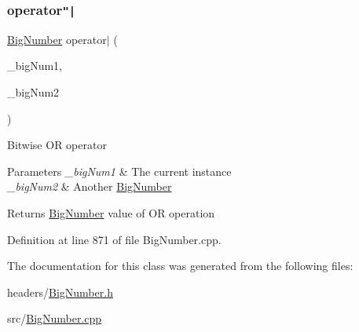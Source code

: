 \subsubsection{\texorpdfstring{operator\texttt{"|}}{operator|}}
{\footnotesize\ttfamily \mbox{\hyperlink{class_big_nums_1_1_big_number}{Big\+Number}} operator$\vert$ (\begin{DoxyParamCaption}\item[{const \mbox{\hyperlink{class_big_nums_1_1_big_number}{Big\+Number}} \&}]{\+\_\+big\+Num1,  }\item[{const \mbox{\hyperlink{class_big_nums_1_1_big_number}{Big\+Number}} \&}]{\+\_\+big\+Num2 }\end{DoxyParamCaption})\hspace{0.3cm}{\ttfamily [friend]}}

Bitwise OR operator 
\begin{DoxyParams}{Parameters}
{\em \+\_\+big\+Num1} & The current instance \\
\hline
{\em \+\_\+big\+Num2} & Another \mbox{\hyperlink{class_big_nums_1_1_big_number}{Big\+Number}} \\
\hline
\end{DoxyParams}
\begin{DoxyReturn}{Returns}
\mbox{\hyperlink{class_big_nums_1_1_big_number}{Big\+Number}} value of OR operation 
\end{DoxyReturn}


Definition at line 871 of file Big\+Number.\+cpp.



The documentation for this class was generated from the following files\+:\begin{DoxyCompactItemize}
\item 
headers/\mbox{\hyperlink{_big_number_8h}{Big\+Number.\+h}}\item 
src/\mbox{\hyperlink{_big_number_8cpp}{Big\+Number.\+cpp}}\end{DoxyCompactItemize}

